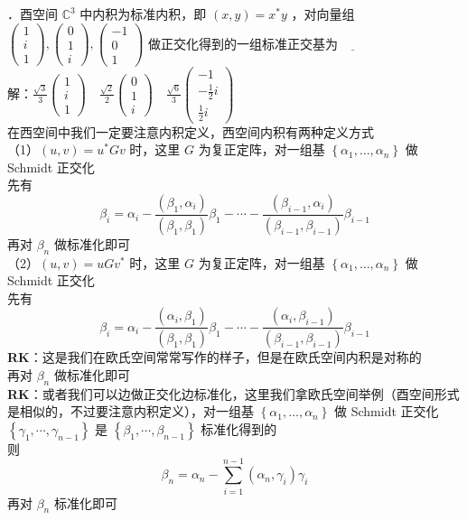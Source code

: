 \documentclass[UTF8]{ctexart}
\begin{document}
．酉空间 $\mathbb{C}^{3}$ 中内积为标准内积，即 $(x, y)=x^{*} y$ ，对向量组 $\left(\begin{array}{l}1 \\ i \\ 1\end{array}\right),\left(\begin{array}{l}0 \\ 1 \\ i\end{array}\right),\left(\begin{array}{c}-1 \\ 0 \\ 1\end{array}\right)$ 做正交化得到的一组标准正交基为$\underline{\hspace{1cm}}$\\
解：$\frac{\sqrt{3}}{3}\left(\begin{array}{l}1 \\ i \\ 1\end{array}\right) \quad \frac{\sqrt{2}}{2}\left(\begin{array}{l}0 \\ 1 \\ i\end{array}\right) \quad \frac{\sqrt{6}}{3}\left(\begin{array}{c}-1 \\ -\frac{1}{2} i \\ \frac{1}{2} i\end{array}\right)$\\
在西空间中我们一定要注意内积定义，西空间内积有两种定义方式\\
（1）$(u, v)=u^{*} G v$ 时，这里 $G$ 为复正定阵，对一组基 $\left\{\alpha_{1}, \ldots, \alpha_{n}\right\}$ 做 Schmidt 正交化\\
先有 $$\beta_{i}=\alpha_{i}-\frac{\left(\beta_{1}, \alpha_{i}\right)}{\left(\beta_{1}, \beta_{1}\right)} \beta_{1}-\cdots-\frac{\left(\beta_{i-1}, \alpha_{i}\right)}{\left(\beta_{i-1}, \beta_{i-1}\right)} \beta_{i-1}$$
再对 $\beta_{n}$ 做标准化即可\\
（2）$(u, v)=u G v^{*}$ 时，这里 $G$ 为复正定阵，对一组基 $\left\{\alpha_{1}, \ldots, \alpha_{n}\right\}$ 做Schmidt 正交化\\
先有 $$\beta_{i}=\alpha_{i}-\frac{\left(\alpha_{i}, \beta_{1}\right)}{\left(\beta_{1}, \beta_{1}\right)} \beta_{1}-\cdots-\frac{\left(\alpha_{i}, \beta_{i-1}\right)}{\left(\beta_{i-1}, \beta_{i-1}\right)} \beta_{i-1}$$
\textbf{RK}：这是我们在欧氏空间常常写作的样子，但是在欧氏空间内积是对称的\\
再对 $\beta_{n}$ 做标准化即可\\
\textbf{RK}：或者我们可以边做正交化边标准化，这里我们拿欧氏空间举例（酉空间形式是相似的，不过要注意内积定义），对一组基 $\left\{\alpha_{1}, \ldots, \alpha_{n}\right\}$ 做 Schmidt 正交化\\
$\left\{\gamma_{1}, \cdots, \gamma_{n-1}\right\}$ 是 $\left\{\beta_{1}, \cdots, \beta_{n-1}\right\}$ 标准化得到的\\
则 $$\beta_{n}=\alpha_{n}-\sum_{i=1}^{n-1}\left(\alpha_{n}, \gamma_{i}\right) \gamma_{i}$$
再对 $\beta_{n}$ 标准化即可\\
\end{document}
